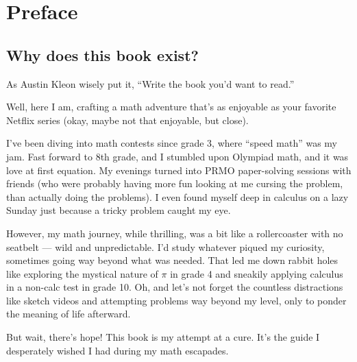 \chapter*{Preface}
\section{Why does this book exist?}
As Austin Kleon wisely put it, ``Write the book you'd want to read.''\par
Well, here I am, crafting a math adventure that's as enjoyable as your favorite Netflix series 
(okay, maybe not that enjoyable, but close).\par\medskip
I've been diving into math contests since grade 3, where ``speed math'' was my jam. 
Fast forward to 8th grade, and I stumbled upon Olympiad math, and it was love at first equation.
My evenings turned into PRMO paper-solving sessions with friends (who were probably having more fun looking at me cursing the problem, 
than actually doing the problems). I even found myself deep in calculus on a lazy Sunday just because a tricky problem caught my eye.
\par
\medskip
However, my math journey, while thrilling, was a bit like a rollercoaster with no seatbelt 
--- wild and unpredictable. I'd study whatever piqued my curiosity, sometimes going way beyond what was needed. 
That led me down rabbit holes like exploring the mystical nature of $\pi$ in grade 4 and sneakily applying calculus in a non-calc test in grade 10.
 Oh, and let's not forget the countless distractions like sketch videos and attempting problems way beyond my level, 
 only to ponder the meaning of life afterward.\par

But wait, there's hope! This book is my attempt at a cure. 
It's the guide I desperately wished I had during my math escapades.

